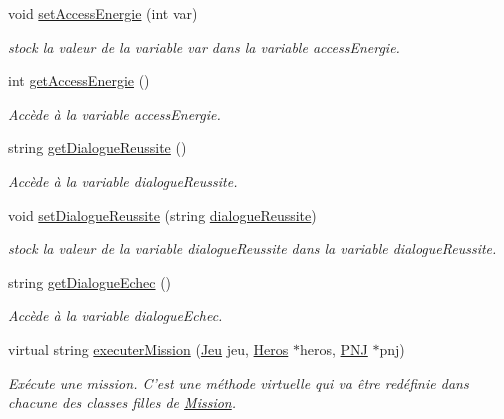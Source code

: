 \begin{DoxyCompactItemize}
void \hyperlink{class_mission_a3b2a2ce4cd3025d2233ff593cd87cae0}{set\-Access\-Energie} (int var)
\begin{DoxyCompactList}\small\item\em stock la valeur de la variable var dans la variable access\-Energie. \end{DoxyCompactList}\item 
int \hyperlink{class_mission_a1fd4aa1e267e0f722f6bdb8891ec053f}{get\-Access\-Energie} ()
\begin{DoxyCompactList}\small\item\em Accède à la variable access\-Energie. \end{DoxyCompactList}\item 
string \hyperlink{class_mission_adedaca4409d2abe41a36c04921440b86}{get\-Dialogue\-Reussite} ()
\begin{DoxyCompactList}\small\item\em Accède à la variable dialogue\-Reussite. \end{DoxyCompactList}\item 
void \hyperlink{class_mission_a168753922a0eaf4fc7ed0a311ac70b46}{set\-Dialogue\-Reussite} (string \hyperlink{class_mission_a75d8fc66d0ed01f1f1192e03528a2612}{dialogue\-Reussite})
\begin{DoxyCompactList}\small\item\em stock la valeur de la variable dialogue\-Reussite dans la variable dialogue\-Reussite. \end{DoxyCompactList}\item 
string \hyperlink{class_mission_af9a813bba373bcac25b42e22c8440c1c}{get\-Dialogue\-Echec} ()
\begin{DoxyCompactList}\small\item\em Accède à la variable dialogue\-Echec. \end{DoxyCompactList}\item 
virtual string \hyperlink{class_mission_ad4375f925eda8637d6346ef468747f44}{executer\-Mission} (\hyperlink{class_jeu}{Jeu} jeu, \hyperlink{class_heros}{Heros} $\ast$heros, \hyperlink{class_p_n_j}{P\-N\-J} $\ast$pnj)
\begin{DoxyCompactList}\small\item\em Exécute une mission. C'est une méthode virtuelle qui va être redéfinie dans chacune des classes filles de \hyperlink{class_mission}{Mission}. \end{DoxyCompactList}\end{DoxyCompactItemize}
